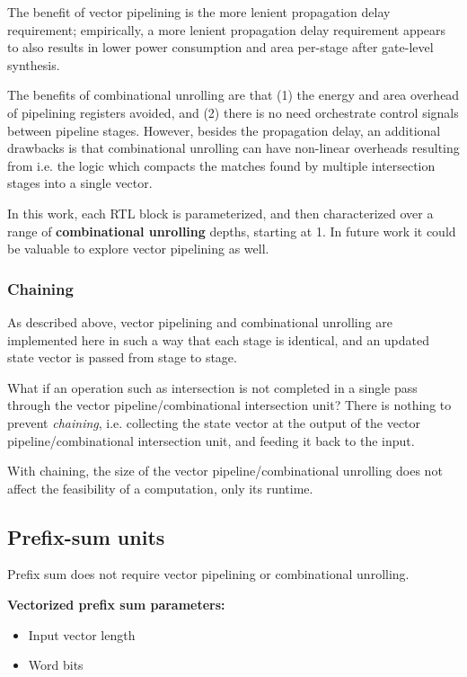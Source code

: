 The benefit of vector pipelining is the more lenient propagation delay requirement; empirically, a more lenient propagation delay requirement appears to also results in lower power consumption and area per-stage after gate-level synthesis.

The benefits of combinational unrolling are that (1) the energy and area overhead of pipelining registers avoided, and (2) there is no need orchestrate control signals between pipeline stages. However, besides the propagation delay, an additional drawbacks is that combinational unrolling can have non-linear overheads resulting from i.e. the logic which compacts the matches found by multiple intersection stages into a single vector.

In this work, each RTL block is parameterized, and then characterized over a range of \textbf{combinational unrolling} depths, starting at 1. In future work it could be valuable to explore vector pipelining as well.

\subsubsection{Chaining}

As described above, vector pipelining and combinational unrolling are implemented here in such a way that each stage is identical, and an updated state vector is passed from stage to stage.

What if an operation such as intersection is not completed in a single pass through the vector pipeline/combinational intersection unit? There is nothing to prevent \textit{chaining}, i.e. collecting the state vector at the output of the vector pipeline/combinational intersection unit, and feeding it back to the input. 

With chaining, the size of the vector pipeline/combinational unrolling does not affect the feasibility of a computation, only its runtime.

\subsection{Prefix-sum units}

Prefix sum does not require vector pipelining or combinational unrolling.

\textbf{Vectorized prefix sum parameters:}

\begin{itemize}
    \item Input vector length
    \item Word bits
\end{itemize}

